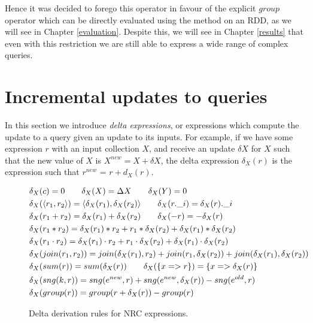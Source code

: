 {{{Hence it was decided to forego this operator in favour of the explicit $group$ operator which can be directly evaluated using the  method on an RDD, as we will see in Chapter \ref{evaluation}.
Despite this, we will see in Chapter \ref{results} that even with this restriction we are still able to express a wide range of complex queries. 

}

\section{Incremental updates to queries} { \label{deltas}



In this section we introduce \textit{delta expressions}, or expressions which compute the update to a query given an update to its inputs. For example, if we have some expression $r$ with an input collection $X$, and receive an update $\delta X$ for $X$ such that the new value of $X$ is $X^{new} = X + \delta X$, the delta expression $\delta_X(r)$ is the expression such that $r^{new}$ = $r + d_X(r)$.

\begin{figure}
\begin{equation*}
\begin{aligned}
&\delta_X(c) = 0 \qquad \delta_X(X) = \Delta X \qquad \delta_X(Y) = 0\\
&\delta_X(\langle r_1, r_2 \rangle) = \langle \delta_X(r_1), \delta_X(r_2) \rangle \qquad \delta_X(r.\_i) = \delta_X(r).\_i\\
&\delta_X(r_1 + r_2) = \delta_X(r_1) + \delta_X(r_2) \qquad \delta_X(-r) = -\delta_X(r)\\
&\delta_X(r_1 * r_2) = \delta_X(r_1)*r_2 + r_1*\delta_X(r_2) + \delta_X(r_1) * \delta_X(r_2) \\
&\delta_X(r_1 \cdot r_2) = \delta_X(r_1) \cdot r_2 + r_1 \cdot \delta_X(r_2) + \delta_X(r_1) \cdot \delta_X(r_2) \\
&\delta_X(join(r_1,r_2)) = join(\delta_X(r_1),r_2) + join(r_1,\delta_X(r_2)) + join(\delta_X(r_1),\delta_X(r_2)) \\
&\delta_X(sum(r)) = sum(\delta_X(r)) \qquad \delta_X(\{x => r\}) = \{x => \delta_X(r)\} \\
&\delta_X(sng(k,r)) = sng(e^{new},r)  + sng(e^{new},\delta_X(r)) - sng(e^{old},r) \\
&\delta_X(group(r)) = group(r + \delta_X(r)) - group(r)
\end{aligned}
\qquad
\end{equation*}
\caption{Delta derivation rules for NRC expressions.}
\label{deltaexprs}
\end{figure}

}}}
